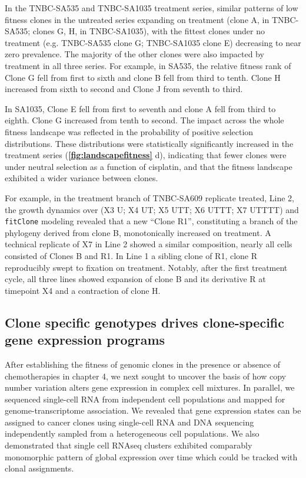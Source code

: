 In the TNBC-SA535 and TNBC-SA1035 treatment series, similar patterns of low fitness clones in the untreated series expanding on treatment (clone A, in TNBC-SA535; clones G, H, in TNBC-SA1035), with the fittest clones under no treatment (e.g. TNBC-SA535 clone G; TNBC-SA1035 clone E) decreasing to near zero prevalence. The majority of the other clones were also impacted by treatment in all three series. For example, in SA535, the relative fitness rank of Clone G fell from first to sixth and clone B fell from third to tenth.  Clone H increased from sixth to second and Clone J from seventh to third.  

In SA1035, Clone E fell from first to seventh and clone A fell from third to eighth. Clone G increased from tenth to second.  The impact across the whole fitness landscape was reflected in the probability of positive selection distributions.  These distributions were statistically significantly increased in the treatment series  (\textbf{\autoref{fig:landscapefitness}} d), indicating that fewer clones were under neutral selection as a function of cisplatin, and that the fitness landscape exhibited a wider variance between clones.

For example, in the treatment branch of TNBC-SA609 replicate treated, Line 2, the growth dynamics over (X3 U; X4 UT; X5 UTT; X6 UTTT; X7 UTTTT) and \texttt{fitClone} modeling revealed that a new ``Clone R1'', constituting a branch of the phylogeny derived from clone B, monotonically increased on treatment.  A technical replicate of X7 in Line 2 showed a similar composition, nearly all cells consisted of Clones B and R1.  In Line 1 a sibling clone of R1, clone R reproducibly swept to fixation on treatment.  Notably, after the first treatment cycle, all three lines showed expansion of clone B and its derivative R at timepoint X4 and a contraction of clone H.



\subsection{Clone specific genotypes drives clone-specific gene expression programs}

After establishing the fitness of genomic clones in the presence or absence of chemotherapies in chapter 4, we next sought to uncover the basis of how copy number variation alters gene expression in complex cell mixtures. In parallel, we sequenced single-cell RNA from independent cell populations and mapped for genome-transcriptome association. 
We revealed that gene expression states can be assigned to cancer clones using single-cell RNA and DNA sequencing independently sampled from a heterogeneous cell populations. We also demonstrated that single cell RNAseq clusters exhibited comparably monomorphic pattern of global expression over time which could be tracked with clonal assignments.

